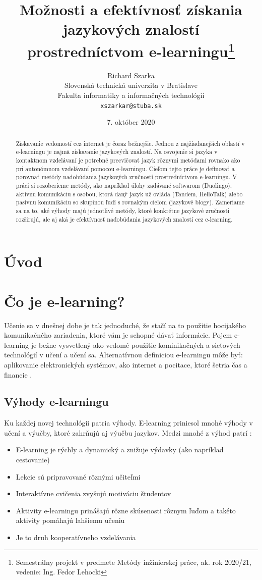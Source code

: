 \documentclass[10pt,oneside,slovak,a4paper]{article}
\title{Možnosti a efektívnosť získania jazykových znalostí prostredníctvom
e-learningu\thanks{Semestrálny projekt v predmete Metódy inžinierskej práce, ak. rok 2020/21, vedenie: Ing. Fedor Lehocki }} %
\author{Richard Szarka\\[2pt]
	{\small Slovenská technická univerzita v Bratislave}\\
	{\small Fakulta informatiky a informačných technológií}\\
	{\small \texttt{xszarkar@stuba.sk}}
	}
\date{\small 7. október 2020} %
\begin{document}
\maketitle

\begin{abstract}
Získavanie vedomostí cez internet je čoraz bežnejšie. Jednou z najžiadanejších oblastí v e-learningu je najmä získavanie jazykových znalostí. Na osvojenie si jazyka v kontaktnom vzdelávaní je potrebné precvičovať jazyk rôznymi metódami rovnako ako pri autonómnom vzdelávaní pomocou e-learningu. Cieľom tejto práce je definovať a porovnať metódy nadobúdania jazykových zručností prostredníctvom e-learningu. V práci si rozoberieme metódy, ako napríklad úlohy zadávané softwarom (Duolingo), aktívnu komunikáciu s osobou, ktorá daný jazyk už ovláda (Tandem, HelloTalk) alebo pasívnu komunikáciu so skupinou ľudí s rovnakým cieľom (jazykové blogy). Zameriame sa na to, aké výhody majú jednotlivé metódy, ktoré konkrétne jazykové zručnosti rozširujú, ale aj aká je efektívnosť nadobúdania jazykových znalostí cez e-learning.
\end{abstract}

\section{Úvod} %

\section{Čo je e-learning?}%
Učenie sa v dnešnej dobe je tak jednoduché, že stačí na to použitie hocijakého komunikačného zariadenia, ktoré vám je schopné dávať informácie\cite{vyhody}. Pojem e-learning je bežne vysvetlený ako vedomé použitie kominikačných a sieťových technológií v učení a učení sa. Alternatívnou definiciou e-learningu môže byť: aplikovanie elektronických systémov, ako internet a pocitace, ktoré šetria čas a financie \cite{efektivnost}. 

\subsection{Výhody e-learningu}%
Ku každej novej technológii patria výhody. E-learning priniesol mnohé výhody v učení a výučby, ktoré zahrňujú aj výučbu jazykov. Medzi mnohé z výhod patrí :
\begin{itemize}
\item E-learning je rýchly a dynamický a znižuje výdavky (ako napríklad cestovanie) \cite{efektivnost}
\item Lekcie sú pripravované rôznými učiteľmi \cite{efektivnost}
\item Interaktívne cvičenia zvyšujú motiváciu študentov \cite{vyhody}
\item Aktivity e-learningu prinášajú rôzne skúsenosti rôznym ľuďom a takéto aktivity pomáhajú lahšiemu učeniu \cite{vyhody}
\item Je to druh kooperatívneho vzdelávania \cite{efektivnost}
\end{itemize}
\end{document}
